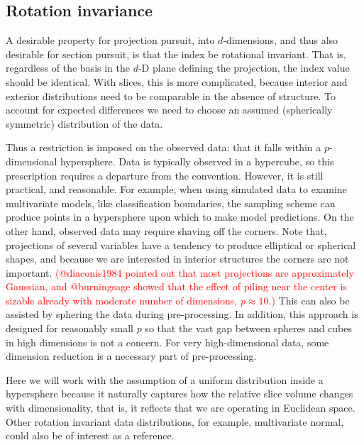 \documentclass[]{interact}
\theoremstyle{plain}%
\theoremstyle{definition}
\theoremstyle{remark}
\begin{document}
\hypertarget{rotation-invariance}{%
\subsection{\texorpdfstring{Rotation invariance
\label{sec:rotinv}}{Rotation invariance }}\label{rotation-invariance}}

A desirable property for projection pursuit, into \(d\)-dimensions, and
thus also desirable for section pursuit, is that the index be rotational
invariant. That is, regardless of the basis in the \(d\)-D plane
defining the projection, the index value should be identical. With
slices, this is more complicated, because interior and exterior
distributions need to be comparable in the absence of structure. To
account for expected differences we need to choose an assumed
(spherically symmetric) distribution of the data.

Thus a restriction is imposed on the observed data: that it falls within
a \(p\)-dimensional hypersphere. Data is typically observed in a
hypercube, so this prescription requires a departure from the
convention. However, it is still practical, and reasonable. For example,
when using simulated data to examine multivariate models, like
classification boundaries, the sampling scheme can produce points in a
hypersphere upon which to make model predictions. On the other hand,
observed data may require shaving off the corners. Note that,
projections of several variables have a tendency to produce elliptical
or spherical shapes, and because we are interested in interior
structures the corners are not important.
\textcolor{red}{(@diaconis1984 pointed out that most projections are approximately Gaussian, and @burningsage showed that the effect of piling near the center is sizable already with moderate number of dimensions, $p\approx10$.)}
This can also be assisted by sphering the data during pre-processing. In
addition, this approach is designed for reasonably small \(p\) so that
the vast gap between spheres and cubes in high dimensions is not a
concern. For very high-dimensional data, some dimension reduction is a
necessary part of pre-processing.

Here we will work with the assumption of a uniform distribution inside a
hypersphere because it naturally captures how the relative slice volume
changes with dimensionality, that is, it reflects that we are operating
in Euclidean space. Other rotation invariant data distributions, for
example, multivariate normal, could also be of interest as a reference.
\end{document}
